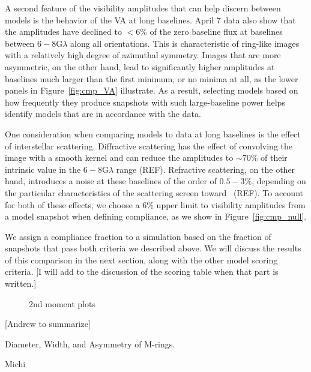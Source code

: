 A second feature of the visibility amplitudes that can help discern
between models is the behavior of the VA at long baselines.
April 7 data also show that the amplitudes have declined to $<6\%$ of
the zero baseline flux at baselines between $6-8$\;G$\lambda$ along
all orientations.
This is characteristic of ring-like images with a relatively high
degree of azimuthal symmetry.
Images that are more asymmetric, on the other hand, lead to
significantly higher amplitudes at baselines much larger than the
first minimum, or no minima at all, as the lower panels in
Figure~\ref{fig:cmp_VA} illustrate.
As a result, selecting models based on how frequently they produce
snapshots with such large-baseline power helps identify models that
are in accordance with the data.

One consideration when comparing models to data at long baselines is
the effect of interstellar scattering.
Diffractive scattering has the effect of convolving the image with a
smooth kernel and can reduce the amplitudes to $\sim 70\%$ of their
intrinsic value in the $6-8$\;G$\lambda$ range (REF).
Refractive scattering, on the other hand, introduces a noise at these
baselines of the order of $0.5-3\%$, depending on the particular
characteristics of the scattering screen toward \sgra\ (REF).
To account for both of these effects, we choose a $6\%$ upper limit to
visibility amplitudes from a model snapshot when defining compliance,
as we show in Figure~\ref{fig:cmp_null}.

We assign a compliance fraction to a simulation based on the fraction
of snapshots that pass both criteria we described above.
We will discuss the results of this comparison in the next section,
along with the other model scoring criteria.
[I will add to the discussion of the scoring table when that part is
  written.]
  

\begin{figure}
  \caption{2nd moment plots}
  \label{fig:cmp_2nd_moment}
\end{figure}

[Andrew to summarize]


Diameter, Width, and Asymmetry of M-rings.

Michi

